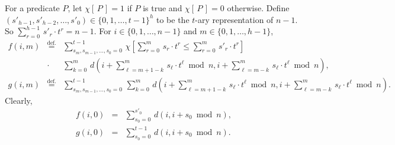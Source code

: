 \documentclass[letterpaper,12pt]{article}
\begin{document}
For a predicate $P$,
let $\chi[\,P\,]=1$ if $P$ is true and $\chi[\,P\,]=0$ otherwise.
Define
$(s'_{h-1},s'_{h-2},\ldots,s'_0)\in\{0,1,\ldots,t-1\}^h$
to be
the $t$-ary representation of $n-1$.
So $\sum_{r=0}^{h-1}\,s'_r\cdot t^r=n-1$.
For $i\in\{0,1,\ldots,n-1\}$ and $m\in\{0,1,\ldots,h-1\}$,
{\small \begin{eqnarray}
f\left(i,m\right)
&\stackrel{\text{def.}}{=}&
\sum_{s_m,s_{m-1},\ldots,s_0=0}^{t-1}\,
\chi\left[\sum_{r=0}^m\, s_r\cdot t^r\le \sum_{r=0}^m\, s'_r\cdot t^r
\right]\nonumber\\
&\cdot&\sum_{k=0}^m\,
d\left(i+\sum_{\ell=m+1-k}^m\, s_\ell \cdot t^\ell \bmod{n},
i+\sum_{\ell=m-k}^m\, s_\ell \cdot t^\ell \bmod{n}
\right),
\label{subsumlessthanorequalto}\\
g\left(i,m\right)
&\stackrel{\text{def.}}{=}&
\sum_{s_m,s_{m-1},\ldots,s_0=0}^{t-1}\,
\sum_{k=0}^m\,
d\left(i+\sum_{\ell=m+1-k}^m\, s_\ell \cdot t^\ell \bmod{n},
i+\sum_{\ell=m-k}^m\, s_\ell \cdot t^\ell \bmod{n}
\right).
\,\,\,\,\,\,\,\,\,\,\label{subsumlessthan}
\end{eqnarray}
}Clearly,
\begin{eqnarray}
f\left(i,0\right)
&=&
\sum_{s_0=0}^{s'_0}\,
d\left(i,i+s_0\bmod{n}\right),
\label{thebasecaseofthefirstfunction}\\
g\left(i,0\right)
&=&
\sum_{s_0=0}^{t-1}\,
d\left(i,i+s_0\bmod{n}\right).
\label{thebasecaseofthesecondfunction}
\end{eqnarray}
\end{document}
